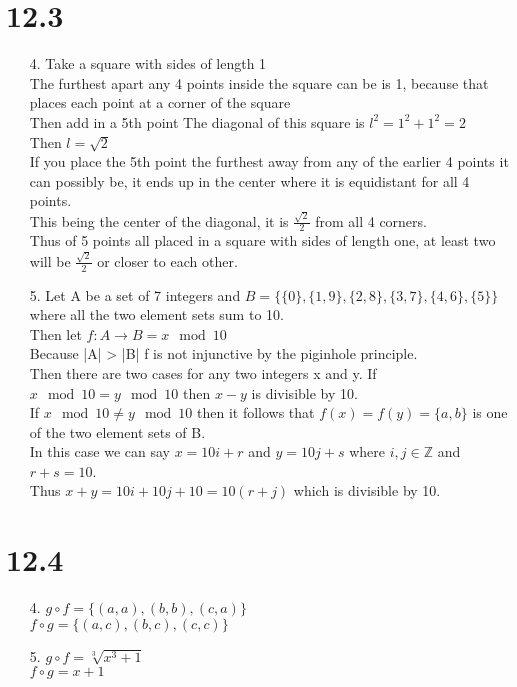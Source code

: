 \documentclass[sigconf]{article}
\begin{document}
\section*{12.3}
\begin{itemize}
  \item[4.] Take a square with sides of length 1\\
            The furthest apart any 4 points inside the square can be is 1, because that places each point at a corner of the square\\
            Then add in a 5th point
            The diagonal of this square is $l^2=1^2+1^2=2$\\
            Then $l=\sqrt{2}$\\
            If you place the 5th point the furthest away from any of the earlier 4 points it can possibly be, it ends up in the center where it is equidistant for all 4 points.\\
            This being the center of the diagonal, it is $\frac{\sqrt{2}}{2}$ from all 4 corners.\\
            Thus of 5 points all placed in a square with sides of length one, at least two will be $\frac{\sqrt{2}}{2}$ or closer to each other.
  \item[5.] Let A be a set of 7 integers and $B=\{\{0\},\{1,9\},\{2,8\},\{3,7\},\{4,6\},\{5\}\}$ where all the two element sets sum to 10.\\
            Then let $f:A\rightarrow B=x \mod 10$\\
            Because |A| > |B| f is not injunctive by the piginhole principle.\\
            Then there are two cases for any two integers x and y.
            If $x \mod 10=y\mod 10$ then $x-y$ is divisible by 10.\\
            If $x\mod 10\neq y\mod 10$ then it follows that $f(x)=f(y)=\{a,b\}$ is one of the two element sets of B.\\
            In this case we can say $x=10i+r$ and $y=10j+s$ where $i,j\in\mathbb{Z}$ and $r+s=10$.\\
            Thus $x+y=10i+10j+10=10(r+j)$ which is divisible by 10.
\end{itemize}

\section*{12.4}
\begin{itemize}
  \item[4.] $g\circ f=\{(a,a),(b,b),(c,a)\}$\\
            $f\circ g=\{(a,c),(b,c),(c,c)\}$
  \item[5.] $g\circ f=\sqrt[3]{x^3+1}$\\
            $f\circ g=x+1$
\end{itemize}
\end{document}

